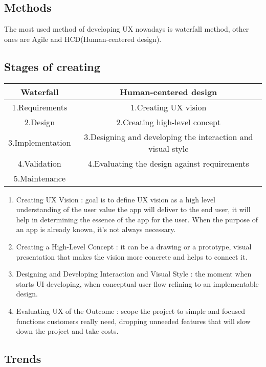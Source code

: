 \documentclass[10pt,twoside,english,a4paper]{article}
\begin{document}
\subsection{Methods}
The most used method of developing UX nowadays is waterfall method, other ones are Agile and HCD(Human-centered design).

\cite{WaterfallUX}
\subsection{Stages of creating}	
\begin{center}
\begin{tabular}{ |c|c| } 
 \hline
 Waterfall & Human-centered design \\ 
\hline\hline
 1.Requirements & 1.Creating UX vision \\ 
\hline
 2.Design & 2.Creating high-level concept \\ 
 \hline
3.Implementation& 3.Designing and developing the interaction and visual style\\ 
 \hline 
4.Validation & 4.Evaluating the design against requirements\\ 
 \hline
5.Maintenance&  \\ 
 \hline
\end{tabular}
\end{center}
\cite{AllUX}
\begin{enumerate}
\item Creating UX Vision : goal is to define UX vision as a high level understanding of the user value the app will deliver to the end user, it will help in determining the essence of the app for the user. When the purpose of an app is already known, it’s not always necessary.
\item Creating a High-Level Concept : it can be a drawing or a prototype, visual presentation that makes the vision more concrete and helps to connect it. 
\item Designing and Developing Interaction and Visual Style : the moment when starts UI developing, when conceptual user flow refining to an implementable design.
\item Evaluating UX of the Outcome : scope the project to simple and focused functions customers really need, dropping unneeded features that will slow down the project and take costs.\cite{Kuusinen2014}
\end{enumerate}

\subsection{Trends}
\end{document}
